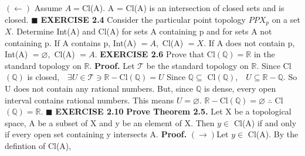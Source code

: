 \documentclass[12pt]{article}
\begin{document}
\((\leftarrow)\) Assume \(A =\)Cl(A).
\newline
A = Cl(A) is an intersection of closed sets and is closed.
\newline \(\blacksquare\)
\newpage
\noindent
\textbf{EXERCISE 2.4} Consider the particular point topology \(PPX_p\) on a set \(X\). Determine Int(A) and Cl(A) for sets A containing p and for sets A not containing p.
\newline \newline
If A contains p, \newline
Int(A) \(=A\),\ Cl(A) \(=X\).
\newline
\newline
If A does not contain p, \newline
Int(A) \(=\varnothing\),\ Cl(A) \(=A\).
\newpage
\noindent
\textbf{EXERCISE 2.6} Prove that Cl\((\mathbb{Q})=\mathbb{R}\) in the standard topology on \(\mathbb{R}\).
\newline \newline
\textbf{Proof.} \newline
Let \(\mathcal{T}\) be the standard topology on \(\mathbb{R}\).
\newline
Since Cl\((\mathbb{Q})\) is closed,\ \ \(\exists U \in \mathcal{T} \ni \mathbb{R} - \)Cl\((\mathbb{Q})=U\)
\newline
Since \(\mathbb{Q} \subseteq\) Cl\((\mathbb{Q})\),\ \ \(U \subseteq \mathbb{R} - \mathbb{Q}\).
\newline \newline
So U does not contain any rational numbers. \newline
But, since \(\mathbb{Q}\) is dense, every open interval contains rational numbers. \newline
This means \(U = \varnothing\).
\newline \newline
\(\mathbb{R} - \)Cl\((\mathbb{Q}) = \varnothing\)
\newline
\(\therefore\) Cl\((\mathbb{Q})=\mathbb{R}\).
\newline \(\blacksquare\)
\newpage
\noindent
\textbf{EXERCISE 2.10} \textbf{Prove Theorem 2.5.} Let X be a topological space, A be a subset of X and y be an element of X. Then \(y \in\) Cl(A) if and only if every open set containing y intersects A. \newline \newline
\textbf{Proof.} \newline
\((\rightarrow)\)Let \(y \in\) Cl(A). \newline
By the defintion of Cl(A),
\end{document}

